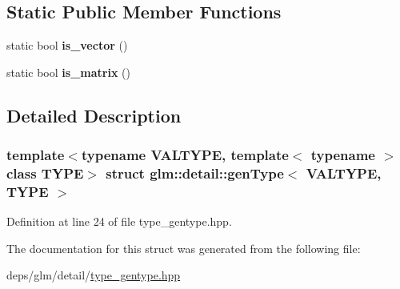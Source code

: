 \subsection*{Static Public Member Functions}
\begin{DoxyCompactItemize}
\item 
\mbox{\label{structglm_1_1detail_1_1genType_ae83087df55201bdc46a37decf3d1c34c}} 
static bool {\bfseries is\+\_\+vector} ()
\item 
\mbox{\label{structglm_1_1detail_1_1genType_a78c650375558d5e2ccfba383cdb59479}} 
static bool {\bfseries is\+\_\+matrix} ()
\end{DoxyCompactItemize}


\subsection{Detailed Description}
\subsubsection*{template$<$typename V\+A\+L\+T\+Y\+PE, template$<$ typename $>$ class T\+Y\+PE$>$\newline
struct glm\+::detail\+::gen\+Type$<$ V\+A\+L\+T\+Y\+P\+E, T\+Y\+P\+E $>$}



Definition at line 24 of file type\+\_\+gentype.\+hpp.



The documentation for this struct was generated from the following file\+:\begin{DoxyCompactItemize}
\item 
deps/glm/detail/\hyperlink{type__gentype_8hpp}{type\+\_\+gentype.\+hpp}\end{DoxyCompactItemize}
